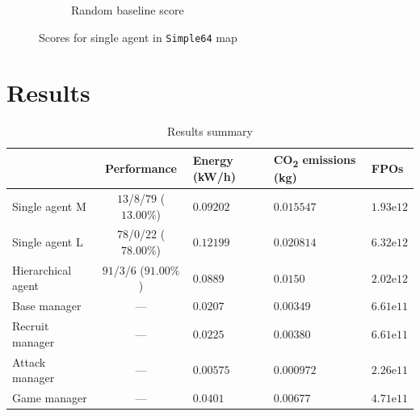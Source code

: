 \begin{figure}[t]
\begin{subfigure}[b]{0.48\textwidth}
        \caption{Random baseline score}
    \end{subfigure}
    \caption{Scores for single agent in \texttt{Simple64} map}
    \label{fig:single_Simple64_scores}
\end{figure}

\section{Results}

\begin{table}[t]
    \centering
    \begin{tabular}{ l|c l l l }
        & Performance & Energy (kW/h) & CO\textsubscript{2} emissions (kg) & FPOs \\
        \hline \hline
        Single agent M & \cellcolor{Maroon!25}$13$/$8$/$79$ ($13.00\%$) & \cellcolor{Dandelion!25}$0.09202$ & \cellcolor{Dandelion!25}$0.015547$ & \cellcolor{OliveGreen!25}$1.93\mathrm{e}12$ \\
        Single agent L & \cellcolor{Dandelion!25}$78$/$0$/$22$ ($78.00\%$) & \cellcolor{Maroon!25}$0.12199$ & \cellcolor{Maroon!25}$0.020814$ & \cellcolor{Maroon!25}$6.32\mathrm{e}12$ \\
        Hierarchical agent & \cellcolor{OliveGreen!25}$91$/$3$/$6$ ($91.00\%$) & \cellcolor{OliveGreen!25}$0.0889$ & \cellcolor{OliveGreen!25}$0.0150$ & \cellcolor{Dandelion!25}$2.02\mathrm{e}12$ \\
        \hline
        \quad Base manager & --- & $0.0207$ & $0.00349$ & $6.61\mathrm{e}11$ \\
        \quad Recruit manager & --- & $0.0225$ & $0.00380$ & $6.61\mathrm{e}11$ \\
        \quad Attack manager & --- & $0.00575$ & $0.000972$ & $2.26\mathrm{e}11$ \\
        \quad Game manager & --- & $0.0401$ & $0.00677$ & $4.71\mathrm{e}11$ \\
    \end{tabular}
    \caption{Results summary}
    \label{tab:results}
\end{table}

